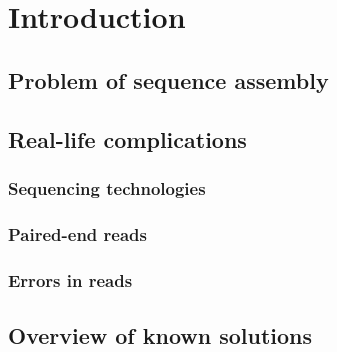 \chapter{Introduction}

\section{Problem of sequence assembly}

\section{Real-life complications}

\subsection{Sequencing technologies}

\subsection{Paired-end reads}

\subsection{Errors in reads}

\section{Overview of known solutions}


